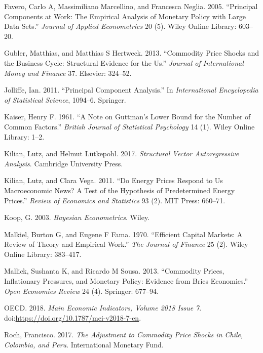 \documentclass[12pt,]{article}
\begin{document}
\hypertarget{ref-favero2005principal}{}
Favero, Carlo A, Massimiliano Marcellino, and Francesca Neglia. 2005.
``Principal Components at Work: The Empirical Analysis of Monetary
Policy with Large Data Sets.'' \emph{Journal of Applied Econometrics} 20
(5). Wiley Online Library: 603--20.

\hypertarget{ref-gubler2013commodity}{}
Gubler, Matthias, and Matthias S Hertweck. 2013. ``Commodity Price
Shocks and the Business Cycle: Structural Evidence for the Us.''
\emph{Journal of International Money and Finance} 37. Elsevier: 324--52.

\hypertarget{ref-jolliffe2011principal}{}
Jolliffe, Ian. 2011. ``Principal Component Analysis.'' In
\emph{International Encyclopedia of Statistical Science}, 1094--6.
Springer.

\hypertarget{ref-kaiser1961note}{}
Kaiser, Henry F. 1961. ``A Note on Guttman's Lower Bound for the Number
of Common Factors.'' \emph{British Journal of Statistical Psychology} 14
(1). Wiley Online Library: 1--2.

\hypertarget{ref-kilian2017structural}{}
Kilian, Lutz, and Helmut Lütkepohl. 2017. \emph{Structural Vector
Autoregressive Analysis}. Cambridge University Press.

\hypertarget{ref-kilian2011energy}{}
Kilian, Lutz, and Clara Vega. 2011. ``Do Energy Prices Respond to Us
Macroeconomic News? A Test of the Hypothesis of Predetermined Energy
Prices.'' \emph{Review of Economics and Statistics} 93 (2). MIT Press:
660--71.

\hypertarget{ref-koop2003bayesian}{}
Koop, G. 2003. \emph{Bayesian Econometrics}. Wiley.

\hypertarget{ref-malkiel1970efficient}{}
Malkiel, Burton G, and Eugene F Fama. 1970. ``Efficient Capital Markets:
A Review of Theory and Empirical Work.'' \emph{The Journal of Finance}
25 (2). Wiley Online Library: 383--417.

\hypertarget{ref-mallick2013commodity}{}
Mallick, Sushanta K, and Ricardo M Sousa. 2013. ``Commodity Prices,
Inflationary Pressures, and Monetary Policy: Evidence from Brics
Economies.'' \emph{Open Economies Review} 24 (4). Springer: 677--94.

\hypertarget{ref-oecd2018indicators}{}
OECD. 2018. \emph{Main Economic Indicators, Volume 2018 Issue 7}.
doi:\href{https://doi.org/https://doi.org/10.1787/mei-v2018-7-en}{https://doi.org/10.1787/mei-v2018-7-en}.

\hypertarget{ref-roch2017adjustment}{}
Roch, Francisco. 2017. \emph{The Adjustment to Commodity Price Shocks in
Chile, Colombia, and Peru}. International Monetary Fund.
\end{document}
